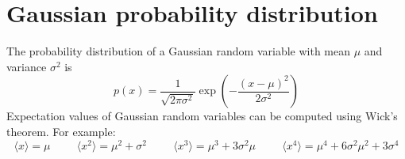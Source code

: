 \documentclass[aps,prd,superscriptaddress,groupedaddress,nofootinbib,nobibnotes]{revtex4}
\newcommand{\be}{\begin{equation}}
\newcommand{\ee}{\end{equation}}
\begin{document}
\appendix

\section{Gaussian probability distribution}
\label{app:gaussian}

\par\noindent
The probability distribution of a Gaussian random variable with mean $\mu$ and variance $\sigma^2$ is
\be
p(x) = \frac{1}{\sqrt{2\pi\sigma^2}} \exp\left( - \frac{(x-\mu)^2}{2\sigma^2} \right)
\ee
Expectation values of Gaussian random variables can be computed using Wick's theorem.
For example:
\be
\langle x \rangle = \mu
  \hspace{1cm}
\langle x^2 \rangle = \mu^2 + \sigma^2
  \hspace{1cm}
\langle x^3 \rangle = \mu^3 + 3 \sigma^2 \mu
  \hspace{1cm}
\langle x^4 \rangle = \mu^4 + 6 \sigma^2 \mu^2 + 3 \sigma^4
\ee
\end{document}
